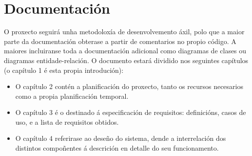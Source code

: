 \section{Documentación}
O proxecto seguirá unha metodoloxía de desenvolvemento áxil, polo que a maior
parte da documentación obterase a partir de comentarios no propio código. A
maiores incluiranse toda a documentación adicional como diagramas de clases
ou diagramas entidade-relación. O documento estará dividido nos seguintes
capítulos (o capítulo 1 é esta propia introdución):
\begin{itemize}
  \item O capítulo 2 contén a planificación do proxecto, tanto os recursos
  necesarios como a propia planificación temporal.
  \item O capítulo 3 é o destinado á especificación de requisitos:
  definicións, casos de uso, e a lista de requisitos obtidos.
  \item O capítulo 4 referirase ao deseño do sistema, dende a interrelación dos
  distintos compoñentes á descrición en detalle do seu funcionamento.
\end{itemize}

